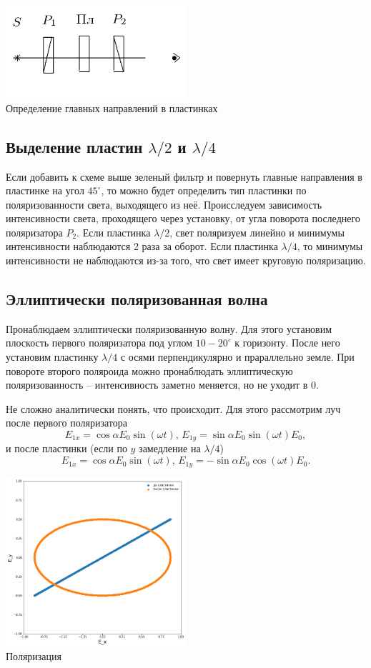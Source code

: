 \begin{center}
\includegraphics[width=0.50\textwidth]{5.png}\\
Определение главных направлений в пластинках
\end{center}

\subsection*{Выделение пластин $\lambda/2$ и $\lambda/4$}
Если добавить к схеме выше зеленый фильтр и повернуть главные направления в пластинке на угол $45^\circ$, то можно будет определить тип пластинки по поляризованности света, выходящего из неё. Происследуем зависимость интенсивности света, проходящего через установку, от угла поворота последнего поляризатора $P_2$. Если пластинка $\lambda/2$, свет поляризуем линейно и минимумы интенсивности наблюдаются 2 раза за оборот. Если пластинка $\lambda/4$, то минимумы интенсивности не наблюдаются из-за того, что свет имеет круговую поляризацию.

\subsection*{Эллиптически поляризованная волна}
Пронаблюдаем эллиптически поляризованную волну. Для этого установим плоскость первого поляризатора под углом $10-20^\circ$ к горизонту. После него установим пластинку $\lambda/4$ с осями перпендикулярно и прараллельно земле.
При повороте второго поляроида можно пронаблюдать эллиптическую поляризованность -- интенсивность заметно меняется, но не уходит в 0.

Не сложно аналитически понять, что происходит. Для этого рассмотрим луч после первого поляризатора
\[E_{1x} = \cos\alpha E_0 \sin(\omega t),\,E_{1y} = \sin\alpha E_0 \sin(\omega t) E_0,\]
и после пластинки (если по $y$ замедление на $\lambda / 4$)
\[E_{1x} = \cos\alpha E_0 \sin(\omega t),\,E_{1y} = - \sin\alpha E_0 \cos(\omega t) E_0.\]

\begin{center}
\includegraphics[width=0.50\textwidth]{7.png}\\
Поляризация
\end{center}

